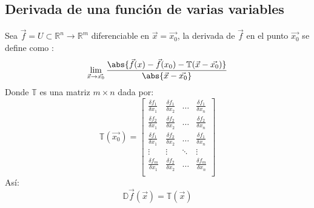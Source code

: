 \documentclass[a4paper]{article}
\begin{document}
\subsection{Derivada de una función de varias variables}
Sea $\vec{f}=U\subset\mathbb{R}^n\longrightarrow\mathbb{R}^m$ diferenciable en $\vec{x}=\vec{x_0}$, la derivada de $\vec{f}$ en el punto $\vec{x_0}$ se define como :
\[\lim_{\vec{x}\rightarrow\vec{x_0}}\frac{\abs{\vec{f}(x)-\vec{f}(x_0)-\mathbb{T}(\vec{x}-\vec{x_0})}}{\abs{\vec{x}-\vec{x_0}}}\]
Donde $\mathbb{T}$ es una matriz $m\times n$ dada por:
\[\mathbb{T}(\vec{x_0})=
\begin{bmatrix}
\frac{\delta f_1}{\delta x_1}&\frac{\delta f_1}{\delta x_2}&\ldots&\frac{\delta f_1}{\delta x_n}\\
\frac{\delta f_2}{\delta x_1}&\frac{\delta f_2}{\delta x_2}&\ldots&\frac{\delta f_2}{\delta x_n}\\
\frac{\delta f_1}{\delta x_1}&\frac{\delta f_2}{\delta x_2}&\ldots&\frac{\delta f_1}{\delta x_n}\\
\vdots&\vdots&\ddots&\vdots\\
\frac{\delta f_m}{\delta x_1}&\frac{\delta f_2}{\delta x_2}&\ldots&\frac{\delta f_m}{\delta x_n}\\
\end{bmatrix}
\]
Así:
\[\mathbb{D}\vec{f}(\vec{x})=\mathbb{T}(\vec{x})\]
\end{document}
